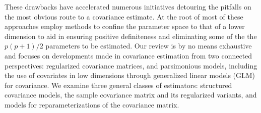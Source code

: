 These drawbacks have accelerated numerous initiatives detouring the pitfalls on the most obvious route to a covariance estimate. At the root of most of these approaches employ methods to confine the parameter space to that of a lower dimension to aid in ensuring positive definiteness and eliminating some of the the $p\left(p + 1\right)/2$ parameters to be estimated. Our review is by no means exhaustive and focuses on developments made in covariance estimation from two connected perspectives: regularized covariance matrices, and parsimonious models, including the use of covariates in low dimensions through generalized linear models (GLM) for covariance. We examine three general classes of estimators: structured covariance models, the sample covariance matrix and its regularized variants, and models for reparameterizations of the covariance matrix. 

\bigskip

%




\bigskip







